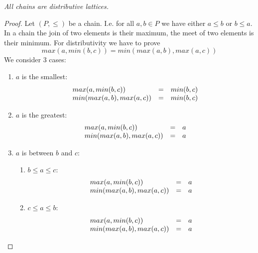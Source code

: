 \begin{theorem}
    \label{thmChainsAreDistributive}
    \emph{All chains are distributive lattices.}

    \begin{proof}
        Let $(P, \le)$ be a chain. I.e. for all $a,b \in P$ we have either $a
        \le b$ or $b \le a$. In a chain
        the join of two elements is their maximum, the meet of two elements is
        their minimum. For distributivity we have to prove
        $$
            max(a, min(b, c)) = min(max(a,b), max(a,c))
        $$
        We consider 3 cases:
        \begin{enumerate}
            \item $a$ is the smallest:
                $$
                \begin{array}{lllll} 
                    max(a, min(b,c)) &=& min(b,c)
                    \\
                    min(max(a,b), max(a,c)) &=& min(b,c)
                 \end{array}
                $$

            \item $a$ is the greatest:
                $$
                \begin{array}{lllll} 
                    max(a, min(b,c)) &=& a
                    \\
                    min(max(a,b), max(a,c)) &=& a
                 \end{array}
                $$

            \item $a$ is between $b$ and $c$:
                \begin{enumerate}
                    \item $b \le a \le c$:
                    $$
                    \begin{array}{lllll} 
                        max(a, min(b,c)) &=& a
                        \\
                        min(max(a,b), max(a,c)) &=& a
                     \end{array}
                    $$

                    \item $c \le a \le b$:
                    $$
                    \begin{array}{lllll} 
                        max(a, min(b,c)) &=& a
                        \\
                        min(max(a,b), max(a,c)) &=& a 
                     \end{array}
                    $$
                \end{enumerate}

        \end{enumerate}
    \end{proof}
\end{theorem}




